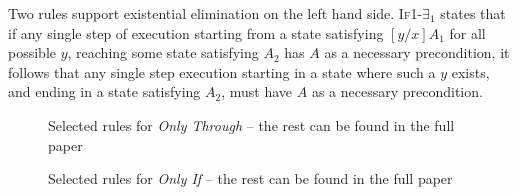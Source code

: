 Two rules support existential elimination on the left hand side. %
\textsc{If1-$\exists_1$} states that if any single step of execution starting
from a state satisfying $[y/x]A_1$ for all possible $y$, reaching some state satisfying
$A_2$ has $A$ as a necessary precondition, it follows that any single step execution
starting in a state where such a $y$ exists, and ending in a state satisfying $A_2$,
must have $A$ as a necessary precondition.   %



\begin{figure}[t]
\footnotesize
{}
\caption{Selected rules for \emph{Only Through} -- the rest can be found in the full paper \cite{necessityFull}} %
\label{f:only-through}
\end{figure}
\begin{figure}[t]
\footnotesize
{}
\caption{Selected rules for \emph{Only If} -- the rest can be found in the full paper \cite{necessityFull}} %
\label{f:only-if}
\end{figure}




